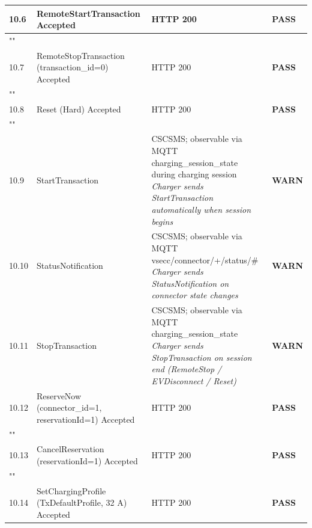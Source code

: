 \documentclass[10pt, a4paper]{article}
\begin{document}
\begin{longtable}{|L{1cm}|L{5.5cm}|M{7cm}|C{1.8cm}|}
\hline
\small 10.6 & \small RemoteStartTransaction  Accepted & HTTP 200 & \textcolor{passgreen}{\textbf{PASS}} \\
\hline
{} \\
\hline
\small 10.7 & \small RemoteStopTransaction (transaction\_id=0)  Accepted & HTTP 200 & \textcolor{passgreen}{\textbf{PASS}} \\
\hline
{} \\
\hline
\small 10.8 & \small Reset (Hard)  Accepted & HTTP 200 & \textcolor{passgreen}{\textbf{PASS}} \\
\hline
{} \\
\hline
\small 10.9 & \small StartTransaction & CSCSMS; observable via MQTT charging\_session\_state during charging session{\newline\normalfont\footnotesize\itshape Charger sends StartTransaction automatically when session begins} & \textcolor{warnorange}{\textbf{WARN}} \\
\hline
\small 10.10 & \small StatusNotification & CSCSMS; observable via MQTT vsecc/connector/+/status/\#{\newline\normalfont\footnotesize\itshape Charger sends StatusNotification on connector state changes} & \textcolor{warnorange}{\textbf{WARN}} \\
\hline
\small 10.11 & \small StopTransaction & CSCSMS; observable via MQTT charging\_session\_state{\newline\normalfont\footnotesize\itshape Charger sends StopTransaction on session end (RemoteStop / EVDisconnect / Reset)} & \textcolor{warnorange}{\textbf{WARN}} \\
\hline
\small 10.12 & \small ReserveNow (connector\_id=1, reservationId=1)  Accepted & HTTP 200 & \textcolor{passgreen}{\textbf{PASS}} \\
\hline
{} \\
\hline
\small 10.13 & \small CancelReservation (reservationId=1)  Accepted & HTTP 200 & \textcolor{passgreen}{\textbf{PASS}} \\
\hline
{} \\
\hline
\small 10.14 & \small SetChargingProfile (TxDefaultProfile, 32 A)  Accepted & HTTP 200 & \textcolor{passgreen}{\textbf{PASS}} \\

\end{longtable}
\end{document}
